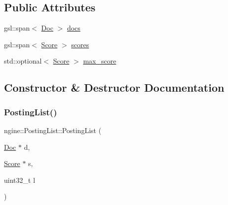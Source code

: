 \subsection*{Public Attributes}
\begin{DoxyCompactItemize}
\item 
gsl\+::span$<$ \hyperlink{structngine_1_1Doc}{Doc} $>$ \hyperlink{structngine_1_1PostingList_a576b13bd7cd2ff09b8795424ba484a7a}{docs}
\item 
gsl\+::span$<$ \hyperlink{structngine_1_1Score}{Score} $>$ \hyperlink{structngine_1_1PostingList_afbb6ea1aacb70cf1f63cc326ab152606}{scores}
\item 
std\+::optional$<$ \hyperlink{structngine_1_1Score}{Score} $>$ \hyperlink{structngine_1_1PostingList_a11449cec5e29b130a17a001d9b7c93e9}{max\+\_\+score}
\end{DoxyCompactItemize}


\subsection{Constructor \& Destructor Documentation}
\mbox{\label{structngine_1_1PostingList_ae1fe89ac9f77d8f73083fa71ed3abcfd}} 
\subsubsection{\texorpdfstring{Posting\+List()}{PostingList()}\hspace{0.1cm}{\footnotesize\ttfamily [1/2]}}
{\footnotesize\ttfamily ngine\+::\+Posting\+List\+::\+Posting\+List (\begin{DoxyParamCaption}\item[{\hyperlink{structngine_1_1Doc}{Doc} $\ast$}]{d,  }\item[{\hyperlink{structngine_1_1Score}{Score} $\ast$}]{s,  }\item[{uint32\+\_\+t}]{l }\end{DoxyParamCaption})\hspace{0.3cm}{\ttfamily [inline]}}

\mbox{\label{structngine_1_1PostingList_a3c6df1462eaf6e8037871941dc667df8}} 
